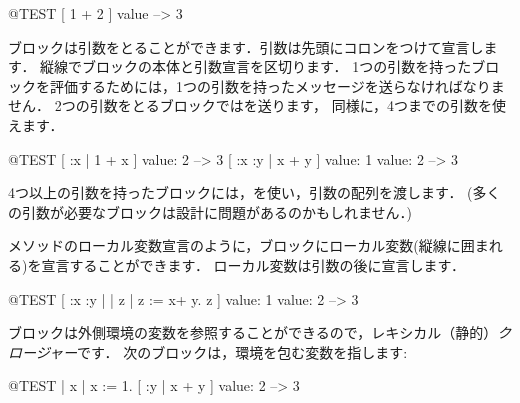 \documentclass[a4paper,10pt,twoside]{book}
\begin{document}
\begin{code}{@TEST}
[ 1 + 2 ] value --> 3
\end{code}

ブロックは引数をとることができます．引数は先頭にコロンをつけて宣言します．
縦線でブロックの本体と引数宣言を区切ります．
1つの引数を持ったブロックを評価するためには，1つの引数を持ったメッセージを送らなければなりません．
2つの引数をとるブロックではを送ります，
同様に，4つまでの引数を使えます．

\begin{code}{@TEST}
[ :x | 1 + x ] value: 2 --> 3
[ :x :y | x + y ] value: 1 value: 2 --> 3
\end{code}

4つ以上の引数を持ったブロックには，を使い，引数の配列を渡します．
(多くの引数が必要なブロックは設計に問題があるのかもしれません．)

メソッドのローカル変数宣言のように，ブロックにローカル変数(縦線に囲まれる)を宣言することができます．
ローカル変数は引数の後に宣言します．

\begin{code}{@TEST}
[ :x :y | | z | z := x+ y. z ] value: 1 value: 2 --> 3
\end{code}

ブロックは外側環境の変数を参照することができるので，レキシカル（静的）\emph{クロージャー}です．
次のブロックは，環境を包む変数を指します:

\begin{code}{@TEST}
| x |
x := 1.
[ :y | x + y ] value: 2 --> 3
\end{code}
\end{document}
